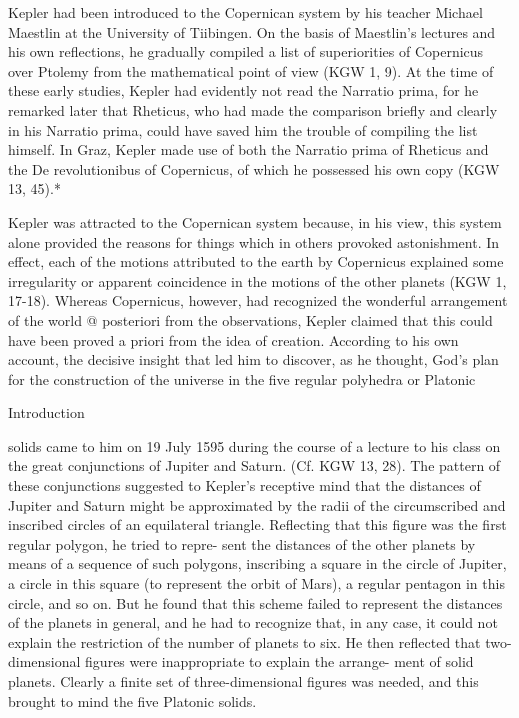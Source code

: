\documentclass{article}
\begin{document}
Kepler had been introduced to the Copernican system by his teacher
Michael Maestlin at the University of Tiibingen. On the basis of
Maestlin’s lectures and his own reflections, he gradually compiled a list of
superiorities of Copernicus over Ptolemy from the mathematical point of
view (KGW 1, 9). At the time of these early studies, Kepler had evidently
not read the Narratio prima, for he remarked later that Rheticus, who had
made the comparison briefly and clearly in his Narratio prima, could have
saved him the trouble of compiling the list himself. In Graz, Kepler made
use of both the Narratio prima of Rheticus and the De revolutionibus of
Copernicus, of which he possessed his own copy (KGW 13, 45).*

Kepler was attracted to the Copernican system because, in his view, this
system alone provided the reasons for things which in others provoked
astonishment. In effect, each of the motions attributed to the earth by
Copernicus explained some irregularity or apparent coincidence in the
motions of the other planets (KGW 1, 17-18). Whereas Copernicus,
however, had recognized the wonderful arrangement of the world @
posteriori from the observations, Kepler claimed that this could have been
proved a priori from the idea of creation. According to his own account,
the decisive insight that led him to discover, as he thought, God’s plan for
the construction of the universe in the five regular polyhedra or Platonic

Introduction

solids came to him on 19 July 1595 during the course of a lecture to his
class on the great conjunctions of Jupiter and Saturn. (Cf. KGW 13, 28).
The pattern of these conjunctions suggested to Kepler’s receptive mind
that the distances of Jupiter and Saturn might be approximated by the
radii of the circumscribed and inscribed circles of an equilateral triangle.
Reflecting that this figure was the first regular polygon, he tried to repre-
sent the distances of the other planets by means of a sequence of such
polygons, inscribing a square in the circle of Jupiter, a circle in this square
(to represent the orbit of Mars), a regular pentagon in this circle, and so
on. But he found that this scheme failed to represent the distances of the
planets in general, and he had to recognize that, in any case, it could not
explain the restriction of the number of planets to six. He then reflected
that two-dimensional figures were inappropriate to explain the arrange-
ment of solid planets. Clearly a finite set of three-dimensional figures was
needed, and this brought to mind the five Platonic solids.
\end{document}
